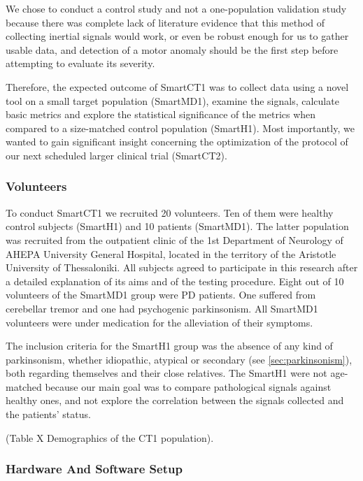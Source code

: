 We chose to conduct a control study and not a one-population validation study because there was complete lack of literature evidence that this method of collecting inertial signals would work, or even be robust enough for us to gather usable data, and detection of a motor anomaly should be the first step before attempting to evaluate its severity. 

Therefore, the expected outcome of \gls{SmartCT1} was to collect data using a novel tool on a small target population (\gls{SmartMD1}), examine the signals, calculate basic metrics and explore the statistical significance of the metrics when compared to a size-matched control population (\gls{SmartH1}). Most importantly, we wanted to gain significant insight concerning the optimization of the protocol of our next scheduled larger clinical trial (\gls{SmartCT2}).

\subsubsection{Volunteers}
\label{subsubsec:smartCT1Volunteers}

To conduct \gls{SmartCT1} we recruited 20 volunteers. Ten of them were healthy control subjects (\gls{SmartH1}) and 10 patients (\gls{SmartMD1}). The latter population was recruited from the outpatient clinic of the 1st Department of Neurology of AHEPA University General Hospital, located in the territory of the Aristotle University of Thessaloniki. All subjects agreed to participate in this research after a detailed explanation of its aims and of the testing procedure. Eight out of 10 volunteers of the \gls{SmartMD1} group were \gls{PD} patients. One suffered from cerebellar tremor and one had psychogenic parkinsonism. All \gls{SmartMD1} volunteers were under medication for the alleviation of their symptoms.

The inclusion criteria for the \gls{SmartH1} group was the absence of any kind of parkinsonism, whether idiopathic, atypical or secondary (see \ref{sec:parkinsonism}), both regarding themselves and their close relatives. The \gls{SmartH1} were not age-matched because our main goal was to compare pathological signals against healthy ones, and not explore the correlation between the signals collected and the patients' status. 

(\textcolor{BurntOrange}{Table X Demographics of the CT1 population}).

\subsubsection{Hardware And Software Setup}
\label{subsubsec:smartCT1SetUp}

